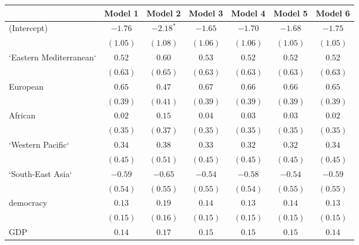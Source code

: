 
\begin{table}[!h]
\begin{center}
\begin{tabular}{l c c c c c c }
\toprule
 & Model 1 & Model 2 & Model 3 & Model 4 & Model 5 & Model 6 \\
\midrule
(Intercept)             & $-1.76$      & $-2.18^{*}$  & $-1.65$      & $-1.70$      & $-1.68$      & $-1.75$      \\
                        & $(1.05)$     & $(1.08)$     & $(1.06)$     & $(1.06)$     & $(1.05)$     & $(1.05)$     \\
`Eastern Mediterranean` & $0.52$       & $0.60$       & $0.53$       & $0.52$       & $0.52$       & $0.52$       \\
                        & $(0.63)$     & $(0.65)$     & $(0.63)$     & $(0.63)$     & $(0.63)$     & $(0.63)$     \\
European                & $0.65$       & $0.47$       & $0.67$       & $0.66$       & $0.66$       & $0.65$       \\
                        & $(0.39)$     & $(0.41)$     & $(0.39)$     & $(0.39)$     & $(0.39)$     & $(0.39)$     \\
African                 & $0.02$       & $0.15$       & $0.04$       & $0.03$       & $0.03$       & $0.02$       \\
                        & $(0.35)$     & $(0.37)$     & $(0.35)$     & $(0.35)$     & $(0.35)$     & $(0.35)$     \\
`Western Pacific`       & $0.34$       & $0.38$       & $0.33$       & $0.32$       & $0.32$       & $0.34$       \\
                        & $(0.45)$     & $(0.51)$     & $(0.45)$     & $(0.45)$     & $(0.45)$     & $(0.45)$     \\
`South-East Asia`       & $-0.59$      & $-0.65$      & $-0.54$      & $-0.58$      & $-0.54$      & $-0.59$      \\
                        & $(0.54)$     & $(0.55)$     & $(0.55)$     & $(0.54)$     & $(0.55)$     & $(0.55)$     \\
democracy               & $0.13$       & $0.19$       & $0.14$       & $0.13$       & $0.14$       & $0.13$       \\
                        & $(0.15)$     & $(0.16)$     & $(0.15)$     & $(0.15)$     & $(0.15)$     & $(0.15)$     \\
GDP                     & $0.14$       & $0.17$       & $0.15$       & $0.15$       & $0.15$       & $0.14$       \\

\end{tabular}
\end{center}
\end{table}
